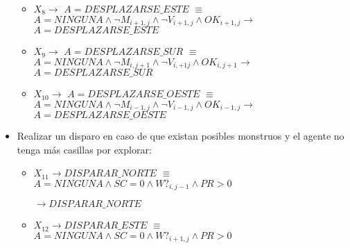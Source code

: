 \begin{itemize}
\begin{itemize}
             \item  $ X_8                 \longrightarrow$
                    $A = DESPLAZARSE\_ESTE $
                    $\equiv$
                    \newline
                    $ A = NINGUNA \land \neg M_{i+1, j} \land \neg V_{i+1, j} \land OK_{i+1, j} \longrightarrow$
                    \newline
                    $A = DESPLAZARSE\_ESTE $
                    
             \item  $ X_9                 \longrightarrow$
                    $A = DESPLAZARSE\_SUR $
                    $\equiv$
                    \newline
                    $ A = NINGUNA \land \neg M_{i, j+1} \land \neg V_{i, +1j} \land OK_{i, j+1} \longrightarrow$
                    \newline
                    $A = DESPLAZARSE\_SUR $
            
             \item  $ X_{10}                 \longrightarrow$
                    $A = DESPLAZARSE\_OESTE $
                    $\equiv$
                    \newline
                    $ A = NINGUNA \land \neg M_{i-1, j} \land \neg V_{i-1, j} \land OK_{i-1, j} \longrightarrow$
                    \newline
                    $A = DESPLAZARSE\_OESTE $
            
        \end{itemize}
    
    \item Realizar un disparo en caso de que existan posibles monstruos y el agente no tenga más casillas por explorar:
        \begin{itemize}
            \item $X_{11} \longrightarrow DISPARAR\_NORTE$
            $\equiv$
            \newline
            $A = NINGUNA \land SC = 0 \land W?_{i, j-1} \land PR > 0$ 
            
            $\longrightarrow DISPARAR\_NORTE$
            
            \item $X_{12} \longrightarrow DISPARAR\_ESTE$
            $\equiv$
            \newline
            $A = NINGUNA \land SC = 0 \land W?_{i+1, j} \land PR > 0$ 
            

\end{itemize}
\end{itemize}
